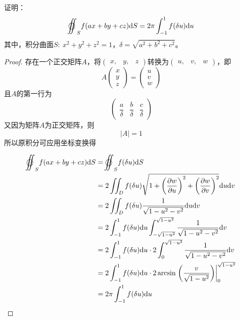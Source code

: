 \begin{theorem}\label{theorem1}

    证明：
    $$\ooint_{S}{f(ax + by + cz)}\diff S = 2\pi\int_{-1}^{1}{f(\delta u)}\diff u$$
    其中，积分曲面$S:\ x^2 + y^2 + z^2 = 1$，$\delta = \sqrt{a^2 + b^2 + c^2}$。

\end{theorem}

\begin{proof}

    存在一个正交矩阵$A$，将$(\begin{smallmatrix} x,& y,& z \end{smallmatrix})$转换为$(\begin{smallmatrix} u,& v,& w \end{smallmatrix})$，即
    $$ A 
    \begin{pmatrix}
        x\\
        y\\
        z
    \end{pmatrix} = 
    \begin{pmatrix}
        u\\
        v\\
        w
    \end{pmatrix}$$
    且$A$的第一行为
    $$\begin{pmatrix}
        \dfrac{a}{\delta} & \dfrac{b}{\delta} & \dfrac{c}{\delta}
    \end{pmatrix}$$
    又因为矩阵$A$为正交矩阵，则
    $$|A| = 1$$
    所以原积分可应用坐标变换得
    
    \begin{align*}
        \ooint_{S}{f(ax + by + cz)}\diff S & = \ooint_{S}{f(\delta u)}\diff S \\
        & = 2\iint_{D}{f(\delta u) \sqrt{1 + \left( \dfrac{\partial w}{\partial u} \right)^2 + \left( \dfrac{\partial w}{\partial v}\right)^2}}\diff u \diff v\\
        & = 2\iint_{D}{f(\delta u) \dfrac{1}{\sqrt{1 - u^2 - v^2}}}\diff u \diff v \\
        & = 2\int_{-1}^{1}{f(\delta u)}\diff u \int_{-\sqrt{1 - u^2}}^{\sqrt{1 - u^2}}{\dfrac{1}{\sqrt{1 - u^2 - v^2}}}\diff v \\
        & = 2\int_{-1}^{1}{f(\delta u)}\diff u \cdot 2 \int_{0}^{\sqrt{1 - u^2}}{\dfrac{1}{\sqrt{1 - u^2 - v^2}}}\diff v \\
        & = 2\int_{-1}^{1}{f(\delta u)}\diff u \cdot 2\arcsin\left.\left(\dfrac{v}{\sqrt{1 - u^2}}\right) \right|_{0}^{\sqrt{1 - u^2}} \\
        & = 2\pi\int_{-1}^{1}{f(\delta u)}\diff u
    \end{align*}

\end{proof}

